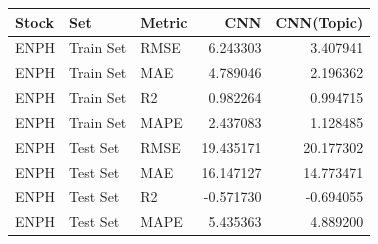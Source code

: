\begin{tabular}{lllrr}
\toprule
Stock & Set & Metric & CNN & CNN(Topic) \\
\midrule
ENPH & Train Set & RMSE & 6.243303 & 3.407941 \\
ENPH & Train Set & MAE & 4.789046 & 2.196362 \\
ENPH & Train Set & R2 & 0.982264 & 0.994715 \\
ENPH & Train Set & MAPE & 2.437083 & 1.128485 \\
ENPH & Test Set & RMSE & 19.435171 & 20.177302 \\
ENPH & Test Set & MAE & 16.147127 & 14.773471 \\
ENPH & Test Set & R2 & -0.571730 & -0.694055 \\
ENPH & Test Set & MAPE & 5.435363 & 4.889200 \\
\bottomrule
\end{tabular}
